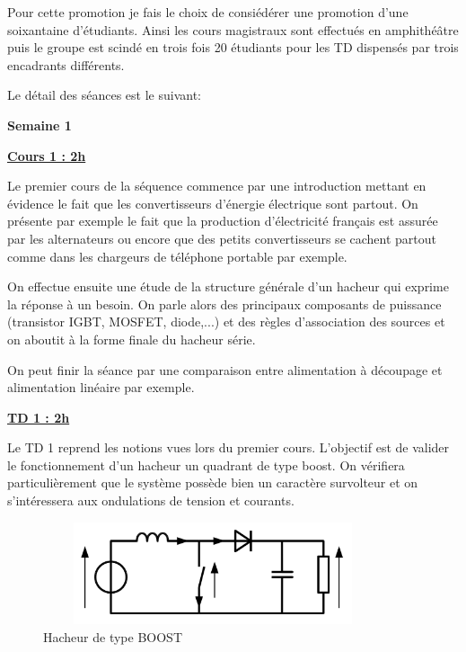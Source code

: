 \documentclass[12pt]{article}
\begin{document}
Pour cette promotion je fais le choix de consiédérer une promotion d'une soixantaine d'étudiants. Ainsi les cours magistraux sont effectués en amphithéâtre puis le groupe est scindé en trois fois 20 étudiants pour les TD dispensés par trois encadrants différents.\par 
\vspace{10pt}

Le détail des séances est le suivant:\par \vspace{10pt}

\color{red}
\textbf{Semaine 1}

\begin{adjustwidth}{5em}{0pt}
\color{blue}
\hspace{20pt}\textbf{\underline{Cours 1 : 2h}}\par
\vspace{10pt}
\color{black}
Le premier cours de la séquence commence par une introduction mettant en évidence le fait que les convertisseurs d'énergie électrique sont partout. On présente par exemple le fait que la production d'électricité français est assurée par les alternateurs ou encore que des petits convertisseurs se cachent partout comme dans les chargeurs de téléphone portable par exemple.\par
\vspace{10pt}
On effectue ensuite une étude de la structure générale d'un hacheur qui exprime la réponse à un besoin. On parle alors des principaux composants de puissance (transistor IGBT, MOSFET, diode,...) et des règles d'association des sources et on aboutit à la forme finale du hacheur série.\par
On peut finir la séance par une comparaison entre alimentation à découpage et alimentation linéaire par exemple.



\color{blue}
\hspace{20pt}\textbf{\underline{TD 1 : 2h}}\par
\vspace{10pt}
\color{black}
Le TD 1 reprend les notions vues lors du premier cours. L'objectif est de valider le fonctionnement d'un hacheur un quadrant de type boost. On vérifiera particulièrement que le système possède bien un caractère survolteur et on s'intéressera aux ondulations de tension et courants.

\begin{figure}[!h]
\centering
\includegraphics[width=10cm,height=3cm,trim=0cm 0cm 0cm 0cm, clip=true]{Images_Rapport/boost}
\caption{Hacheur de type BOOST}
\end{figure} 

\end{adjustwidth}
\end{document}
